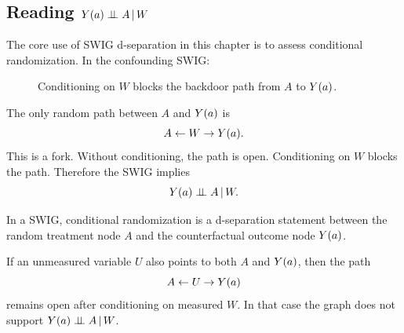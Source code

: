 \subsection{Reading $Y(a)\perp\!\!\!\perp A\,\vert\, W$}

The core use of SWIG d-separation in this chapter is to assess conditional randomization. In the confounding SWIG:

\begin{figure}[H]
\centering
{}
\caption{Conditioning on $W$ blocks the backdoor path from $A$ to $Y(a)$.}
\end{figure}

The only random path between $A$ and $Y(a)$ is
\[
A\leftarrow W\to Y(a).
\]
This is a fork. Without conditioning, the path is open. Conditioning on $W$ blocks the path. Therefore the SWIG implies
\[
Y(a)\perp\!\!\!\perp A\,\vert\, W.
\]

\begin{keyidea}
In a SWIG, conditional randomization is a d-separation statement between the random treatment node $A$ and the counterfactual outcome node $Y(a)$.
\end{keyidea}

If an unmeasured variable $U$ also points to both $A$ and $Y(a)$, then the path
\[
A\leftarrow U\to Y(a)
\]
remains open after conditioning on measured $W$. In that case the graph does not support $Y(a)\perp\!\!\!\perp A\,\vert\, W$.
